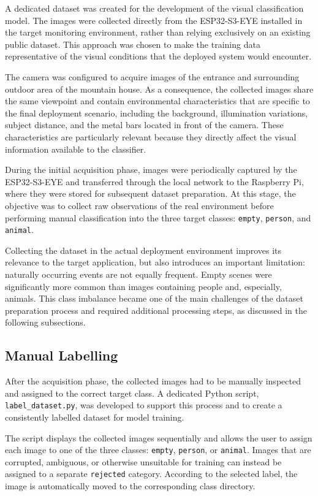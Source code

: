 \documentclass{article}
\begin{document}
A dedicated dataset was created for the development of the visual
classification model. The images were collected directly from the
ESP32-S3-EYE installed in the target monitoring environment, rather than
relying exclusively on an existing public dataset. This approach was chosen
to make the training data representative of the visual conditions that the
deployed system would encounter.

The camera was configured to acquire images of the entrance and surrounding
outdoor area of the mountain house. As a consequence, the collected images
share the same viewpoint and contain environmental characteristics that are
specific to the final deployment scenario, including the background,
illumination variations, subject distance, and the metal bars located in
front of the camera. These characteristics are particularly relevant because
they directly affect the visual information available to the classifier.

During the initial acquisition phase, images were periodically captured by
the ESP32-S3-EYE and transferred through the local network to the Raspberry
Pi, where they were stored for subsequent dataset preparation. At this stage,
the objective was to collect raw observations of the real environment before
performing manual classification into the three target classes:
\texttt{empty}, \texttt{person}, and \texttt{animal}.

Collecting the dataset in the actual deployment environment improves its
relevance to the target application, but also introduces an important
limitation: naturally occurring events are not equally frequent. Empty
scenes were significantly more common than images containing people and,
especially, animals. This class imbalance became one of the main challenges
of the dataset preparation process and required additional processing steps,
as discussed in the following subsections.
\subsection{Manual Labelling}
\label{subsec:manual-labelling}

After the acquisition phase, the collected images had to be manually
inspected and assigned to the correct target class. A dedicated Python
script, \texttt{label\_dataset.py}, was developed to support this process
and to create a consistently labelled dataset for model training.

The script displays the collected images sequentially and allows the user
to assign each image to one of the three classes: \texttt{empty},
\texttt{person}, or \texttt{animal}. Images that are corrupted, ambiguous,
or otherwise unsuitable for training can instead be assigned to a separate
\texttt{rejected} category. According to the selected label, the image is
automatically moved to the corresponding class directory.
\end{document}
